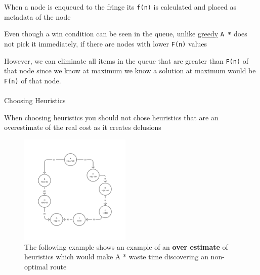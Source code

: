 \documentclass[
  letterpaper,
  DIV=11,
  numbers=noendperiod]{scrartcl}
\makeatletter
\let\oldparagraph\paragraph
\renewcommand{\paragraph}{
    \@ifstar
      \xxxParagraphStar
      \xxxParagraphNoStar
  }
\newcommand{\xxxParagraphStar}[1]{\oldparagraph*{#1}\mbox{}}
\newcommand{\xxxParagraphNoStar}[1]{\oldparagraph{#1}\mbox{}}
\makeatother
\begin{document}
When a node is enqueued to the fringe its \texttt{f(n)} is calculated
and placed as metadata of the node

Even though a win condition can be seen in the queue, unlike
\hyperref[greedy-algorithm]{greedy} \texttt{A\ *} does not pick it
immediately, if there are nodes with lower \texttt{F(n)} values

However, we can eliminate all items in the queue that are greater than
\texttt{F(n)} of that node since we know at maximum we know a solution
at maximum would be \texttt{F(n)} of that node.

\newpage{}

\paragraph{Choosing Heuristics}\label{choosing-heuristics}

\begin{tcolorbox}[enhanced jigsaw, opacitybacktitle=0.6, title=\textcolor{quarto-callout-caution-color}{\faFire}\hspace{0.5em}{Caution}, toptitle=1mm, left=2mm, breakable, titlerule=0mm, bottomtitle=1mm, bottomrule=.15mm, leftrule=.75mm, colframe=quarto-callout-caution-color-frame, arc=.35mm, rightrule=.15mm, toprule=.15mm, coltitle=black, colback=white, opacityback=0, colbacktitle=quarto-callout-caution-color!10!white]

When choosing heuristics you should not chose heuristics that are an
overestimate of the real cost as it creates delusions

\begin{figure}[H]

{\centering \includegraphics[width=2.08333in,height=\textheight,keepaspectratio]{./nop.png}

}

\caption{The following example shows an example of an \textbf{over
estimate} of heuristics which would make A * waste time discovering an
non-optimal route}

\end{figure}%

\end{tcolorbox}
\end{document}
